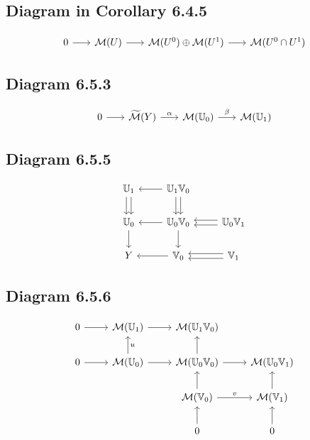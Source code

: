 \documentclass[leqno]{amsart}
\begin{document}
	\subsection*{Diagram in Corollary 6.4.5}

	\begin{equation*}
		\begin{tikzcd}[sep=scriptsize]
			0 \arrow{r} & \mathcal{M}(U) \arrow{r} & \mathcal{M}(U^0) \oplus \mathcal{M}(U^1) \arrow{r} & \mathcal{M}(U^0 \cap U^1)
		\end{tikzcd}
	\end{equation*}

	\subsection*{Diagram 6.5.3}

	\begin{equation*}
		\begin{tikzcd}[sep=scriptsize]
			0 \arrow{r} & \widetilde{\mathcal{M}}(Y) \arrow{r}{\alpha} & \mathcal{M}(\mathbb{U}_0) \arrow{r}{\beta} & \mathcal{M}(\mathbb{U}_1)
		\end{tikzcd}
	\end{equation*}

	\subsection*{Diagram 6.5.5}

	\begin{equation*}
		\begin{tikzcd}
			\mathbb{U}_1 \arrow[shift right]{d} \arrow[shift left]{d} & \mathbb{U}_1 \mathbb{V}_0 \arrow[shift right]{d} \arrow[shift left]{d} \arrow{l} & \\ 
			\mathbb{U}_0 \arrow{d} & \mathbb{U}_0 \mathbb{V}_0  \arrow{d} \arrow{l} & \mathbb{U}_0 \mathbb{V}_1 \arrow[shift right]{l} \arrow[shift left]{l} \\ 
			Y & \mathbb{V}_0 \arrow{l} & \mathbb{V}_1 \arrow[shift right]{l} \arrow[shift left]{l}
		\end{tikzcd}
	\end{equation*}

	\subsection*{Diagram 6.5.6}

	\begin{equation*}
		\begin{tikzcd}
			0 \arrow{r} & \mathcal{M}(\mathbb{U}_1) \arrow{r} & \mathcal{M}(\mathbb{U}_1 \mathbb{V}_0) & \\ 
			0 \arrow{r} & \mathcal{M}(\mathbb{U}_0) \arrow{u}[swap]{u} \arrow{r} &  \mathcal{M}(\mathbb{U}_0 \mathbb{V}_0) \arrow{r} \arrow{u} & \mathcal{M}(\mathbb{U}_0 \mathbb{V}_1)  \\
			& & \mathcal{M}(\mathbb{V}_0) \arrow{u} \arrow{r}{v} & \mathcal{M}(\mathbb{V}_1) \arrow{u} \\ 
			& & 0 \arrow{u} & 0 \arrow{u}
		\end{tikzcd}
	\end{equation*}
\end{document}
